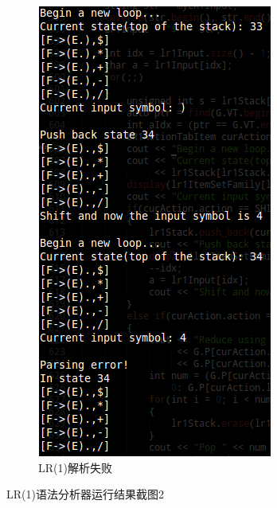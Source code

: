 \documentclass{article}
\begin{document}
\begin{CJK*}{UTF8}{gbsn}
\begin{figure}
\begin{subfigure}[b]{0.4\textwidth}
                \includegraphics[width=\textwidth]{lr1no.png}
                \caption{LR(1)解析失败}
                \label{fig:lr1}
        \end{subfigure}             
        \caption{LR(1)语法分析器运行结果截图2}\label{fig:lr1screenshot2}
\end{figure}


\end{CJK*}
\end{document}
